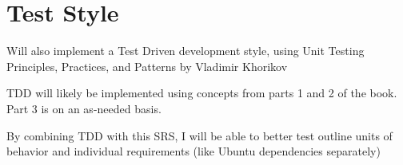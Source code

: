 \section{Test Style}

Will also implement a Test Driven development style, using Unit Testing Principles, Practices, and Patterns by Vladimir Khorikov

TDD will likely be implemented using concepts from parts 1 and 2 of the book. Part 3 is on an as-needed basis.

By combining TDD with this SRS, I will be able to better test outline units of behavior and individual requirements (like Ubuntu dependencies separately)
